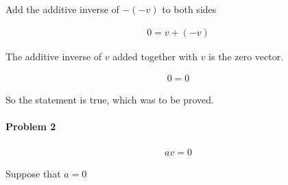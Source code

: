 Add the additive inverse of $-(-v)$ to both sides

\begin{align*}
	0 = v+(-v)
\end{align*}

The additive inverse of $v$ added together with $v$ is the zero vector.

\begin{align*}
	0 = 0
\end{align*}

So the statement is true, which was to be proved.

\paragraph{Problem 2}

\begin{align*}
	av = 0
\end{align*}

Suppose that $a=0$ 






































































